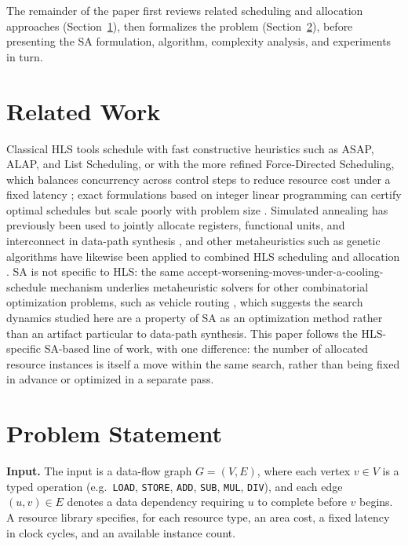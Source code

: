 \documentclass[conference]{IEEEtran}
\begin{document}
    The remainder of the paper first reviews related scheduling and allocation approaches
    (Section~\ref{sec:related-work}), then formalizes the problem
    (Section~\ref{sec:problem-statement}), before presenting the SA formulation, algorithm,
    complexity analysis, and experiments in turn.

    \section{Related Work}
    \label{sec:related-work}

    Classical HLS tools schedule with fast constructive heuristics such as ASAP, ALAP, and List
    Scheduling, or with the more refined Force-Directed Scheduling, which balances concurrency across
    control steps to reduce resource cost under a fixed latency \cite{DeMicheli1994,PaulinKnight1989};
    exact formulations based on integer linear programming can certify optimal schedules but scale
    poorly with problem size \cite{HwangLeeHsu1991}. Simulated annealing has previously been used to
    jointly allocate registers, functional units, and interconnect in data-path synthesis
    \cite{Devadas1989}, and other metaheuristics such as genetic algorithms have likewise been applied
    to combined HLS scheduling and allocation \cite{Heijligers1995}. SA is not specific to HLS: the
    same accept-worsening-moves-under-a-cooling-schedule mechanism underlies metaheuristic solvers for
    other combinatorial optimization problems, such as vehicle routing \cite{Blocho2020}, which
    suggests the search dynamics studied here are a property of SA as an optimization method rather
    than an artifact particular to data-path synthesis. This paper follows the HLS-specific SA-based
    line of work, with one difference: the number of allocated resource instances is itself a move
    within the same search, rather than being fixed in advance or optimized in a separate pass.

    \section{Problem Statement}
    \label{sec:problem-statement}

    \textbf{Input.} The input is a data-flow graph $G = (V, E)$, where each vertex $v \in V$ is a
    typed operation (e.g.\ \texttt{LOAD}, \texttt{STORE}, \texttt{ADD}, \texttt{SUB}, \texttt{MUL},
    \texttt{DIV}), and each edge $(u, v) \in E$ denotes a data dependency requiring $u$ to complete
    before $v$ begins. A resource library specifies, for each resource type, an area cost, a fixed
    latency in clock cycles, and an available instance count.
\end{document}
